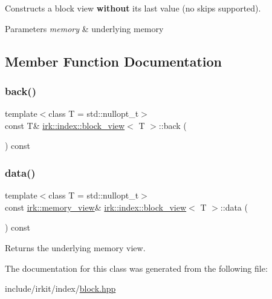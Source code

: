 Constructs a block view {\bfseries without} its last value (no skips supported). 
\begin{DoxyParams}{Parameters}
{\em memory} & underlying memory \\
\hline
\end{DoxyParams}


\subsection{Member Function Documentation}
\mbox{\label{classirk_1_1index_1_1block__view_a3ecf4e4f284b21ce77a8dda80ac37161}} 
\subsubsection{\texorpdfstring{back()}{back()}}
{\footnotesize\ttfamily template$<$class T  = std\+::nullopt\+\_\+t$>$ \\
const T\& \mbox{\hyperlink{classirk_1_1index_1_1block__view}{irk\+::index\+::block\+\_\+view}}$<$ T $>$\+::back (\begin{DoxyParamCaption}{ }\end{DoxyParamCaption}) const\hspace{0.3cm}{\ttfamily [inline]}}

\mbox{\label{classirk_1_1index_1_1block__view_a90c3c66aad54b62b4378b4a653fb4260}} 
\subsubsection{\texorpdfstring{data()}{data()}}
{\footnotesize\ttfamily template$<$class T  = std\+::nullopt\+\_\+t$>$ \\
const \mbox{\hyperlink{classirk_1_1memory__view}{irk\+::memory\+\_\+view}}\& \mbox{\hyperlink{classirk_1_1index_1_1block__view}{irk\+::index\+::block\+\_\+view}}$<$ T $>$\+::data (\begin{DoxyParamCaption}{ }\end{DoxyParamCaption}) const\hspace{0.3cm}{\ttfamily [inline]}}



Returns the underlying memory view. 



The documentation for this class was generated from the following file\+:\begin{DoxyCompactItemize}
\item 
include/irkit/index/\mbox{\hyperlink{block_8hpp}{block.\+hpp}}\end{DoxyCompactItemize}

